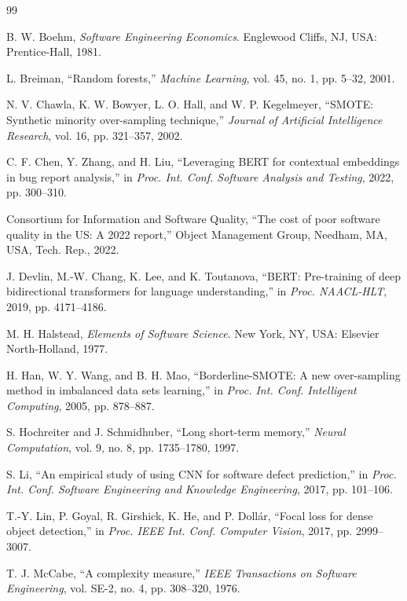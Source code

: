 \documentclass[12pt,a4paper,oneside]{report}
\begin{document}
{
\begin{thebibliography}{99}
\setlength{\itemsep}{10pt}

B. W. Boehm, \textit{Software Engineering Economics}. Englewood Cliffs, NJ, USA: Prentice-Hall, 1981.

L. Breiman, ``Random forests,'' \textit{Machine Learning}, vol. 45, no. 1, pp. 5--32, 2001.

N. V. Chawla, K. W. Bowyer, L. O. Hall, and W. P. Kegelmeyer, ``SMOTE: Synthetic minority over-sampling technique,'' \textit{Journal of Artificial Intelligence Research}, vol. 16, pp. 321--357, 2002.

C. F. Chen, Y. Zhang, and H. Liu, ``Leveraging BERT for contextual embeddings in bug report analysis,'' in \textit{Proc. Int. Conf. Software Analysis and Testing}, 2022, pp. 300--310.

Consortium for Information and Software Quality, ``The cost of poor software quality in the US: A 2022 report,'' Object Management Group, Needham, MA, USA, Tech. Rep., 2022.

J. Devlin, M.-W. Chang, K. Lee, and K. Toutanova, ``BERT: Pre-training of deep bidirectional transformers for language understanding,'' in \textit{Proc. NAACL-HLT}, 2019, pp. 4171--4186.

M. H. Halstead, \textit{Elements of Software Science}. New York, NY, USA: Elsevier North-Holland, 1977.

H. Han, W. Y. Wang, and B. H. Mao, ``Borderline-SMOTE: A new over-sampling method in imbalanced data sets learning,'' in \textit{Proc. Int. Conf. Intelligent Computing}, 2005, pp. 878--887.

S. Hochreiter and J. Schmidhuber, ``Long short-term memory,'' \textit{Neural Computation}, vol. 9, no. 8, pp. 1735--1780, 1997.

S. Li, ``An empirical study of using CNN for software defect prediction,'' in \textit{Proc. Int. Conf. Software Engineering and Knowledge Engineering}, 2017, pp. 101--106.

T.-Y. Lin, P. Goyal, R. Girshick, K. He, and P. Dollár, ``Focal loss for dense object detection,'' in \textit{Proc. IEEE Int. Conf. Computer Vision}, 2017, pp. 2999--3007.

T. J. McCabe, ``A complexity measure,'' \textit{IEEE Transactions on Software Engineering}, vol. SE-2, no. 4, pp. 308--320, 1976.


\end{thebibliography}}
\end{document}
